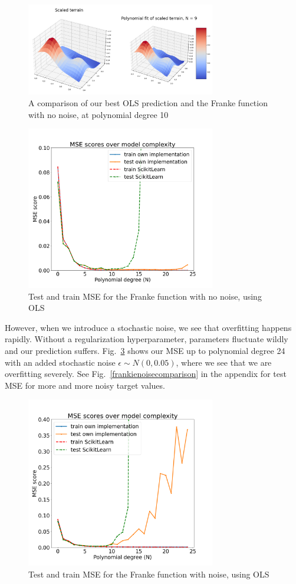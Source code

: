 \documentclass[twocolumn,10pt,cleanfoot]{asme2ej}
\begin{document}
\begin{figure}[h]
\centerline{\includegraphics[width=3.25in]{figure/frankenonoise.png}}
\caption{A comparison of our best OLS prediction and the Franke function with no noise, at polynomial degree 10}
\label{frankenonoise}
\end{figure}

\begin{figure}[h]
\centerline{\includegraphics[width=3.25in]{figure/frankenonoisemse.png}}
\caption{Test and train MSE for the Franke function with no noise, using OLS}
\label{frankenonoisemse}
\end{figure}

However, when we introduce a stochastic noise, we see that overfitting happens rapidly. Without a regularization hyperparameter, parameters fluctuate wildly and our prediction suffers. Fig.~\ref{frankenoisemse} shows our MSE up to polynomial degree 24 with an added stochastic noise $\epsilon \sim N(0,0.05)$, where we see that we are overfitting severely. See Fig.~\ref{frankienoisecomparison} in the appendix for test MSE for more and more noisy target values. 

\begin{figure}[h]
\centerline{\includegraphics[width=3.25in]{figure/frankenoisemse.png}}
\caption{Test and train MSE for the Franke function with noise, using OLS}
\label{frankenoisemse}
\end{figure}
\end{document}
